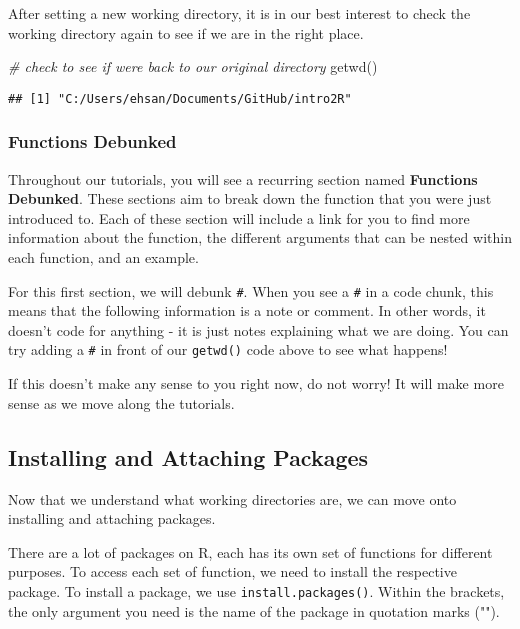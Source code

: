 \documentclass[
]{book}
\newenvironment{Shaded}{\begin{snugshade}}{\end{snugshade}}
\newcommand{\CommentTok}[1]{\textcolor[rgb]{0.56,0.35,0.01}{\textit{#1}}}
\newcommand{\FunctionTok}[1]{\textcolor[rgb]{0.00,0.00,0.00}{#1}}
\newcommand{\NormalTok}[1]{#1}
\begin{document}
After setting a new working directory, it is in our best interest to check the working directory again to see if we are in the right place.

\begin{Shaded}
\begin{Highlighting}[]
\CommentTok{\# check to see if we\textquotesingle{}re back to our original directory}
\FunctionTok{getwd}\NormalTok{()}
\end{Highlighting}
\end{Shaded}

\begin{verbatim}
## [1] "C:/Users/ehsan/Documents/GitHub/intro2R"
\end{verbatim}

\hypertarget{functions-debunked}{%
\subsubsection{Functions Debunked}\label{functions-debunked}}

Throughout our tutorials, you will see a recurring section named \textbf{Functions Debunked}. These sections aim to break down the function that you were just introduced to. Each of these section will include a link for you to find more information about the function, the different arguments that can be nested within each function, and an example.

For this first section, we will debunk \texttt{\#}. When you see a \texttt{\#} in a code chunk, this means that the following information is a note or comment. In other words, it doesn't code for anything - it is just notes explaining what we are doing. You can try adding a \texttt{\#} in front of our \texttt{getwd()} code above to see what happens!

If this doesn't make any sense to you right now, do not worry! It will make more sense as we move along the tutorials.

\hypertarget{installing-and-attaching-packages}{%
\subsection{Installing and Attaching Packages}\label{installing-and-attaching-packages}}

Now that we understand what working directories are, we can move onto installing and attaching packages.

There are a lot of packages on R, each has its own set of functions for different purposes. To access each set of function, we need to install the respective package. To install a package, we use \texttt{install.packages()}. Within the brackets, the only argument you need is the name of the package in quotation marks ("").
\end{document}
